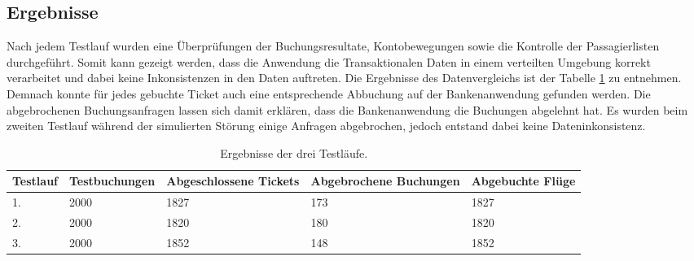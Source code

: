 \subsection{Ergebnisse}
\label{subsec:evaluation:resultsTestRuns}
Nach jedem Testlauf wurden eine Überprüfungen der Buchungsresultate, Kontobewegungen sowie die Kontrolle der Passagierlisten durchgeführt. Somit kann gezeigt werden, dass die Anwendung die Transaktionalen Daten in einem verteilten Umgebung korrekt verarbeitet und dabei keine Inkonsistenzen in den Daten auftreten. Die Ergebnisse des Datenvergleichs ist der Tabelle \ref{tab:evaluation:resultsTestRuns} zu entnehmen. Demnach konnte für jedes gebuchte Ticket auch eine entsprechende Abbuchung auf der Bankenanwendung gefunden werden. Die abgebrochenen Buchungsanfragen lassen sich damit erklären, dass die Bankenanwendung die Buchungen abgelehnt hat. Es wurden beim zweiten Testlauf während der simulierten Störung einige Anfragen abgebrochen, jedoch entstand dabei keine Dateninkonsistenz.
\begin{table}
    \centering
    \begin{tabular}{p{1.5 cm} p{2.5 cm} p{2.5 cm} p{2.5 cm} p{2.5 cm}}
        Testlauf    & Testbuchungen       &   Abgeschlossene Tickets & Abgebrochene Buchungen & Abgebuchte Flüge  \\ \hline
            1.      & 2000                &         1827             &      173               &         1827        \\
            2.      & 2000                &         1820             &      180               &         1820        \\
            3.      & 2000                &         1852             &      148               &         1852        
    \end{tabular}
    \caption{Ergebnisse der drei Testläufe.}
    \label{tab:evaluation:resultsTestRuns}
\end{table}

